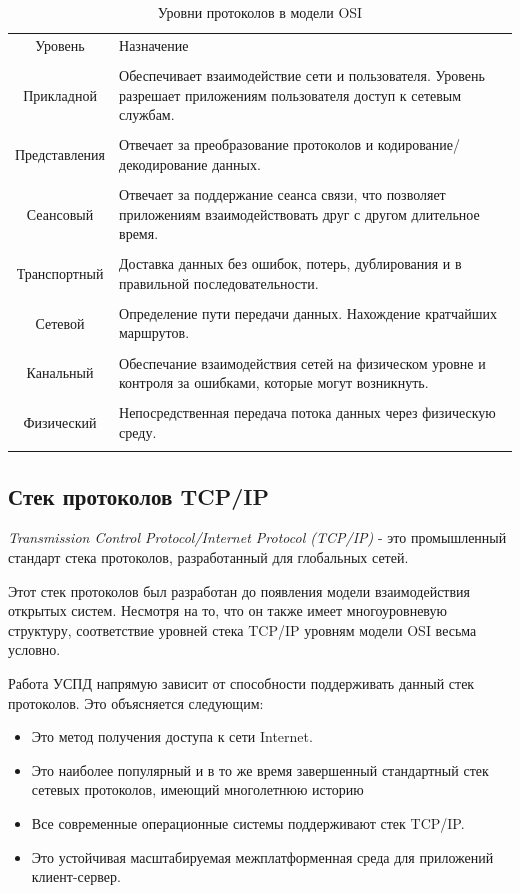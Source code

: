\begin{table}[h!]
\caption{Уровни протоколов в модели OSI}
\label{osi}
	\begin{tabular}{|c| >{\centering} m{120mm} <{\centering}|}
	\hline
	Уровень & Назначение \\
	\tabularnewline
	\hline
	Прикладной & Обеспечивает взаимодействие сети и пользователя. Уровень разрешает приложениям пользователя доступ к сетевым службам.\\
	\tabularnewline
	\hline
	Представления & Отвечает за преобразование протоколов и кодирование/декодирование данных.\\
	\tabularnewline
	\hline	
	Сеансовый & Отвечает за поддержание сеанса связи, что позволяет приложениям взаимодействовать друг с другом длительное время.\\
	\tabularnewline
	\hline
	Транспортный & Доставка данных без ошибок, потерь, дублирования и в правильной последовательности.\\
	\tabularnewline
	\hline
	Сетевой & Определение пути передачи данных. Нахождение кратчайших маршрутов.\\
	\tabularnewline
	\hline
	Канальный & Обеспечание взаимодействия сетей на физическом уровне и контроля за ошибками, которые могут возникнуть.\\
	\tabularnewline
	\hline
	Физический & Непосредственная передача потока данных через физическую среду.\\
	\tabularnewline
	\hline 
	\end{tabular}
\end{table}

\subsection{Стек протоколов TCP/IP}

\textit{Transmission Control Protocol/Internet Protocol (TCP/IP)} - это промышленный стандарт стека протоколов, разработанный для глобальных сетей\cite{tcpip}.

Этот стек протоколов был разработан до появления модели взаимодействия открытых систем. Несмотря на то, что он также имеет многоуровневую структуру, соответствие уровней стека TCP/IP уровням модели OSI весьма условно.

Работа УСПД напрямую зависит от способности поддерживать данный стек протоколов. Это объясняется следующим:
\begin{itemize}
\item Это метод получения доступа к сети Internet.
\item Это наиболее популярный и в то же время завершенный стандартный стек сетевых протоколов, имеющий многолетнюю историю
\item Все современные операционные системы поддерживают стек TCP/IP. 
\item Это устойчивая масштабируемая межплатформенная среда для приложений клиент-сервер.
\end{itemize}

